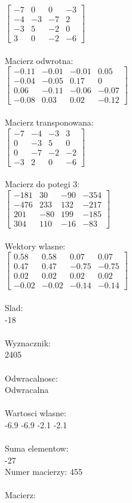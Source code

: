 \documentclass[a4paper,12pt]{article}
\begin{document}
$\begin{bmatrix} -7&0&0&-3\\-4&-3&-7&2\\-3&5&-2&0\\3&0&-2&-6 \end{bmatrix}$
\\
\\
Macierz odwrotna:\\

$\begin{bmatrix} -0.11&-0.01&-0.01&0.05\\-0.04&-0.05&0.17&0\\0.06&-0.11&-0.06&-0.07\\-0.08&0.03&0.02&-0.12 \end{bmatrix}$
\\
\\
Macierz transponowana:\\

$\begin{bmatrix} -7&-4&-3&3\\0&-3&5&0\\0&-7&-2&-2\\-3&2&0&-6 \end{bmatrix}$
\\
\\
Macierz do potegi 3:\\

$\begin{bmatrix} -181&30&-90&-354\\-476&233&132&-217\\201&-80&199&-185\\304&110&-16&-83 \end{bmatrix}$
\\
\\
Wektory wlasne:\\

$\begin{bmatrix} 0.58&0.58&0.07&0.07\\0.47&0.47&-0.75&-0.75\\0.02&0.02&0.02&0.02\\-0.02&-0.02&-0.14&-0.14 \end{bmatrix}$
\\
\\
Slad:\\
-18
\\
\\
Wyznacznik:\\
2405
\\
\\
Odwracalnosc:\\
Odwracalna
\\
\\
Wartosci wlasne:\\
-6.9 -6.9 -2.1 -2.1
\\
\\
Suma elementow:\\
-27
\\
\newpage
Numer macierzy:
455
\\
\\
Macierz:\\
\end{document}
